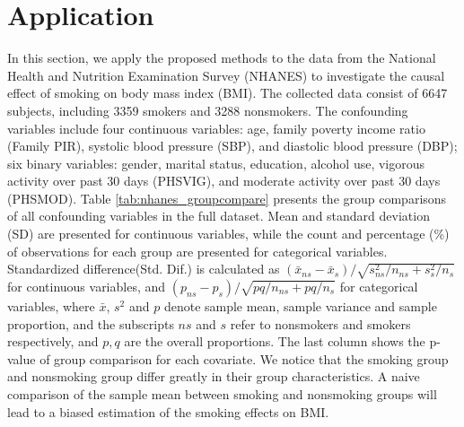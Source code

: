 \documentclass[11pt]{article}
\numberwithin{equation}{section}
\begin{document}
\section{Application}\label{sec:application}
In this section, we apply the proposed methods to the data from the National Health and Nutrition Examination Survey (NHANES) to investigate the causal effect of smoking on body mass index (BMI). The collected data consist of 6647 subjects, including 3359 smokers and 3288 nonsmokers. The confounding variables include four continuous variables: age, family poverty income ratio (Family PIR), systolic blood pressure (SBP), and diastolic blood pressure (DBP); six binary variables: gender, marital status, education, alcohol use, vigorous activity over past 30 days (PHSVIG), and moderate activity over past 30 days (PHSMOD). Table \ref{tab:nhanes_groupcompare} presents the group comparisons of all confounding variables in the full dataset. Mean and standard deviation (SD) are presented for continuous variables, while the count and percentage (\%) of observations for each group are presented for categorical variables. Standardized difference(Std. Dif.) is calculated as $(\bar{x}_{ns}-\bar{x}_s)/\sqrt{s_{ns}^2/n_{ns}+s_s^2/n_s}$ for continuous variables, and $(p_{ns}-p_s)/\sqrt{pq/n_{ns}+pq/n_s}$ for categorical variables, where $\bar{x}$, $s^2$ and $p$ denote sample mean, sample variance and sample proportion, and the subscripts $ns$ and $s$ refer to nonsmokers and smokers respectively, and $p,q$ are the overall proportions. The last column shows the p-value of group comparison for each covariate. We notice that the smoking group and nonsmoking group differ greatly in their group characteristics. A naive comparison of the sample mean between smoking and nonsmoking groups will lead to a biased estimation of the smoking effects on BMI.
\end{document}
